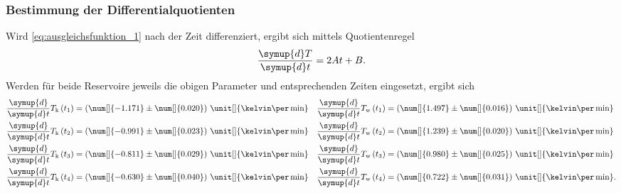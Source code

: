 % 


\subsubsection{Bestimmung der Differentialquotienten}
\label{sec: dif_quot}
Wird \eqref{eq:ausgleichsfunktion_1} nach der Zeit differenziert, ergibt sich mittels Quotientenregel
\begin{align*}
    \frac{\symup{d}T}{\symup{d}t} = 2 A t + B.
\end{align*}
%
Werden für beide Reservoire jeweils die obigen Parameter und entsprechenden Zeiten eingesetzt, ergibt sich 
\begin{align*}
    \frac{\symup{d}}{\symup{d}t} T_\text{k} \left(t_1\right) &= \left(\num[]{-1.171} \pm \num[]{0.020} \right)\, \unit[]{\kelvin\per\min}  &
    \frac{\symup{d}}{\symup{d}t} T_\text{w} \left(t_1\right) &= \left(\num[]{ 1.497} \pm \num[]{0.016} \right)\, \unit[]{\kelvin\per\min}   \\
    \frac{\symup{d}}{\symup{d}t} T_\text{k} \left(t_2\right) &= \left(\num[]{-0.991} \pm \num[]{0.023} \right)\, \unit[]{\kelvin\per\min}  &
    \frac{\symup{d}}{\symup{d}t} T_\text{w} \left(t_2\right) &= \left(\num[]{ 1.239} \pm \num[]{0.020} \right)\, \unit[]{\kelvin\per\min} \\
    \frac{\symup{d}}{\symup{d}t} T_\text{k} \left(t_3\right) &= \left(\num[]{-0.811} \pm \num[]{0.029} \right)\, \unit[]{\kelvin\per\min} &
    \frac{\symup{d}}{\symup{d}t} T_\text{w} \left(t_3\right) &= \left(\num[]{ 0.980} \pm \num[]{0.025} \right)\, \unit[]{\kelvin\per\min} \\
    \frac{\symup{d}}{\symup{d}t} T_\text{k} \left(t_4\right) &= \left(\num[]{-0.630} \pm \num[]{0.040} \right)\, \unit[]{\kelvin\per\min}  &
    \frac{\symup{d}}{\symup{d}t} T_\text{w} \left(t_4\right) &= \left(\num[]{ 0.722} \pm \num[]{0.031} \right)\, \unit[]{\kelvin\per\min}.
\end{align*}
%

